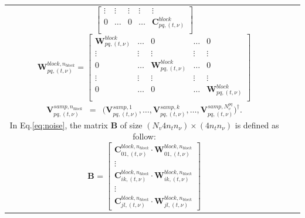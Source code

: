 \documentclass[useAMS,usenatbib]{mn2e}
\begin{document}
\begin{tabular}{*3{c}}
\begin{equation*}
\begin{bmatrix}
    \vdots & \vdots & \vdots & \vdots & \vdots \\
    0 & \dots& 0 &\dots & \mathbf{C}_{pq,(t,\nu)}^{block}\\
  \end{bmatrix}
\end{equation*}
\begin{equation*}
\mathbf{W}_{pq,(t,\nu)}^{block,n_{block}}=
  \begin{bmatrix}
    \mathbf{W}_{pq,(t,\nu)}^{block} &\dots & 0 & \dots & 0\\
    \vdots & \vdots & \vdots & \vdots & \vdots\\
    0 & \dots& \mathbf{W}_{pq,(t,\nu)}^{block} &\dots & 0\\
    \vdots & \vdots & \vdots & \vdots & \vdots \\
    0 & \dots& 0 &\dots & \mathbf{W}_{pq,(t,\nu)}^{block}\\
  \end{bmatrix}
\end{equation*}
\begin{eqnarray*}
\mathbf{V}_{pq,(t,\nu)}^{samp,n_{block}}&=&\Big(\mathbf{V}_{pq,(t,\nu)}^{samp,1},\dots, \mathbf{V}_{pq,(t,\nu)}^{samp,k}, \dots,
\mathbf{V}_{pq,(t,\nu)}^{samp,N^{pq}_v}\Big)^{\dagger}. 
\end{eqnarray*}
In Eq.\ref{eq:noise}, the matrix $\mathbf{B}$ of size $(N_v 4 n_t n_{\nu})\times (4 n_t n_{\nu})$ is defined as follow:
\begin{equation*}
\mathbf{B}_{}=
  \begin{bmatrix}
    \mathbf{C}_{01,(t,\nu)}^{block,n_{block}}\cdot \mathbf{W}_{01,(t,\nu)}^{block,n_{block}}\\
    \vdots\\
    \mathbf{C}_{ik,(t,\nu)}^{block,n_{block}}\cdot \mathbf{W}_{ik,(t,\nu)}^{block,n_{block}}\\
    \vdots \\
    \mathbf{C}_{jl,(t,\nu)}^{block,n_{block}}\cdot \mathbf{W}_{jl,(t,\nu)}^{block,n_{block}}
  \end{bmatrix}
\end{equation*}

\end{tabular}
\end{document}
